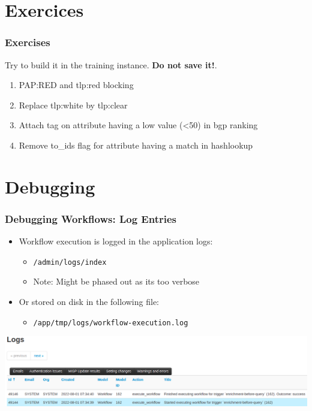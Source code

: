 \section{Exercices}
\begin{frame}
    \frametitle{Exercises}
    Try to build it in the training instance. \textbf{Do not save it!}.
    \vspace{0.5em}
    \begin{enumerate}
        \item PAP:RED and tlp:red blocking
        \item Replace tlp:white by tlp:clear
        \item Attach tag on attribute having a low value (<50) in bgp ranking
        \item Remove to\_ids flag for attribute having a match in hashlookup
    \end{enumerate}
\end{frame}

\section{Debugging}
\begin{frame}
    \frametitle{Debugging Workflows: Log Entries}
    \begin{itemize}
        \item Workflow execution is logged in the application logs:
        \begin{itemize}
            \item \texttt{/admin/logs/index}
            \item Note: Might be phased out as its too verbose
        \end{itemize}
        \item Or stored on disk in the following file:
        \begin{itemize}
            \item \texttt{/app/tmp/logs/workflow-execution.log}
        \end{itemize}
    \end{itemize}
    \begin{center}
        \includegraphics[width=1.0\linewidth]{pictures/workflow-debug.png}
    \end{center}
\end{frame}

